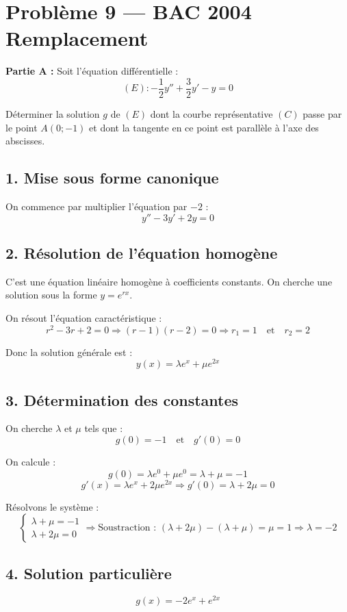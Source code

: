 \documentclass[12pt]{article}
\begin{document}
\section*{Problème 9 --- BAC 2004 Remplacement}

\textbf{Partie A :} Soit l’équation différentielle :  
\[
(E) : -\frac{1}{2} y'' + \frac{3}{2} y' - y = 0
\]

Déterminer la solution \( g \) de \( (E) \) dont la courbe représentative \( (C) \) passe par le point \( A(0 ; -1) \) et dont la tangente en ce point est parallèle à l’axe des abscisses.

\subsection*{1. Mise sous forme canonique}
On commence par multiplier l'équation par \( -2 \) :
\[
y'' - 3 y' + 2 y = 0
\]

\subsection*{2. Résolution de l'équation homogène}
C'est une équation linéaire homogène à coefficients constants. On cherche une solution sous la forme \( y = e^{rx} \).

On résout l'équation caractéristique :
\[
r^2 - 3r + 2 = 0 \Rightarrow (r - 1)(r - 2) = 0
\Rightarrow r_1 = 1 \quad \text{et} \quad r_2 = 2
\]

Donc la solution générale est :
\[
y(x) = \lambda e^{x} + \mu e^{2x}
\]

\subsection*{3. Détermination des constantes}
On cherche \( \lambda \) et \( \mu \) tels que :
\[
g(0) = -1 \quad \text{et} \quad g'(0) = 0
\]

On calcule :
\[
g(0) = \lambda e^0 + \mu e^0 = \lambda + \mu = -1 \tag{1}
\]
\[
g'(x) = \lambda e^{x} + 2\mu e^{2x} \Rightarrow g'(0) = \lambda + 2\mu = 0 \tag{2}
\]

Résolvons le système :
\[
\begin{cases}
\lambda + \mu = -1 \\
\lambda + 2\mu = 0
\end{cases}
\Rightarrow \text{Soustraction : } (\lambda + 2\mu) - (\lambda + \mu) = \mu = 1
\Rightarrow \lambda = -2
\]

\subsection*{4. Solution particulière}

\[
\boxed{g(x) = -2 e^x + e^{2x}}
\]
\end{document}
